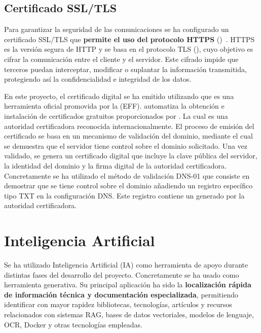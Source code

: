 \subsection{Certificado SSL/TLS}\label{https}
Para garantizar la seguridad de las comunicaciones se ha configurado un certificado SSL/TLS que \textbf{permite el uso del protocolo HTTPS} ()~\cite{herramienta:HTTPvsHTTPS}. HTTPS es la versión segura de HTTP y se basa en el protocolo TLS (), cuyo objetivo es cifrar la comunicación entre el cliente y el servidor. Este cifrado impide que terceros puedan interceptar, modificar o suplantar la información transmitida, protegiendo así la confidencialidad e integridad de los datos.

En este proyecto, el certificado digital se ha emitido utilizando  que es una herramienta oficial promovida por la  (EFF).  automatiza la obtención e instalación de certificados gratuitos proporcionados por . La cual es una autoridad certificadora reconocida internacionalmente. El proceso de emisión del certificado se basa en un mecanismo de validación del dominio, mediante el cual se demuestra que el servidor tiene control sobre el dominio solicitado. Una vez validado, se genera un certificado digital que incluye la clave pública del servidor, la identidad del dominio y la firma digital de la autoridad certificadora. Concretamente se ha utilizado el método de validación DNS-01 que consiste en demostrar que se tiene control sobre el dominio añadiendo un registro específico tipo TXT en la configuración DNS. Este registro contiene un  generado por la autoridad certificadora.

\section{Inteligencia Artificial}

Se ha utilizado Inteligencia Artificial (IA) como herramienta de apoyo durante distintas fases del desarrollo del proyecto. Concretamente se ha usado  como herramienta generativa. Su principal aplicación ha sido la \textbf{localización rápida de información técnica y documentación especializada}, permitiendo identificar con mayor rapidez bibliotecas, tecnologías, artículos y recursos relacionados con sistemas RAG, bases de datos vectoriales, modelos de lenguaje, OCR, Docker y otras tecnologías empleadas. 

